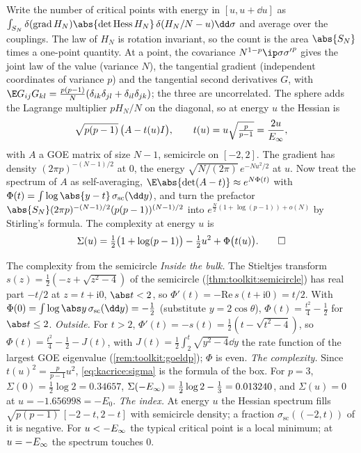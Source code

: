\begin{refsection}
\begin{heuristic}
Write the number of critical points with energy in $[u,u+\dd u]$ as $\int_{S_N}\delta(\kacricegrad H_N)\abs{\det\kacriceHess H_N}\,\delta(H_N/N-u)\dd\sigma$ and average over the couplings. The law of $H_N$ is rotation invariant, so the count is the area $\abs{S_N}$ times a one-point quantity. At a point, the covariance $N^{1-p}\ip\sigma{\sigma'}^p$ gives the joint law of the value (variance $N$), the tangential gradient (independent coordinates of variance $p$) and the tangential second derivatives $G$, with $\E G_{ij}G_{kl}=\frac{p(p-1)}N(\delta_{ik}\delta_{jl}+\delta_{il}\delta_{jk})$; the three are uncorrelated. The sphere adds the Lagrange multiplier $pH_N/N$ on the diagonal, so at energy $u$ the Hessian is
\[
\sqrt{p(p-1)}\,\bigl(A-t(u)I\bigr),\qquad t(u)=u\sqrt{\tfrac p{p-1}}=\frac{2u}{E_\infty},
\]
with $A$ a GOE matrix of size $N-1$, semicircle on $[-2,2]$. The gradient has density $(2\pi p)^{-(N-1)/2}$ at $0$, the energy $\sqrt{N/(2\pi)}\,e^{-Nu^2/2}$ at $u$. Now treat the spectrum of $A$ as self-averaging, $\E\abs{\det(A-t)}\approx e^{N\Phi(t)}$ with $\Phi(t)=\int\log\abs{y-t}\,\sigma_{\mathrm{sc}}(\dd y)$, and turn the prefactor $\abs{S_N}(2\pi p)^{-(N-1)/2}(p(p-1))^{(N-1)/2}$ into $e^{\frac N2(1+\log(p-1))+o(N)}$ by Stirling's formula. The complexity at energy $u$ is
\begin{equation}\label{eq:kacrice:sigma}
\Sigma(u)=\tfrac12\bigl(1+\log(p-1)\bigr)-\tfrac12u^2+\Phi\bigl(t(u)\bigr).\qedhere
\end{equation}
\end{heuristic}

\begin{computation}{The complexity from the semicircle}\label{comp:kacrice:potential}
\step \emph{Inside the bulk.} The Stieltjes transform $s(z)=\frac12(-z+\sqrt{z^2-4})$ of the semicircle (\cref{thm:toolkit:semicircle}) has real part $-t/2$ at $z=t+\mathrm i0$, $\abs t<2$, so $\Phi'(t)=-\mathrm{Re}\,s(t+\mathrm i0)=t/2$. With $\Phi(0)=\int\log\abs y\,\sigma_{\mathrm{sc}}(\dd y)=-\frac12$ (substitute $y=2\cos\theta$), $\Phi(t)=\frac{t^2}4-\frac12$ for $\abs t\le2$.
\step \emph{Outside.} For $t>2$, $\Phi'(t)=-s(t)=\frac12(t-\sqrt{t^2-4})$, so $\Phi(t)=\frac{t^2}4-\frac12-J(t)$, with $J(t)=\frac12\int_2^t\sqrt{y^2-4}\dd y$ the rate function of the largest GOE eigenvalue (\cref{rem:toolkit:goeldp}); $\Phi$ is even.
\step \emph{The complexity.} Since $t(u)^2=\frac p{p-1}u^2$, \eqref{eq:kacrice:sigma} is the formula of the box. For $p=3$, $\Sigma(0)=\frac12\log2=0.34657$, $\Sigma(-E_\infty)=\frac12\log2-\frac13=0.013240$, and $\Sigma(u)=0$ at $u=-1.656998=-E_0$.
\step \emph{The index.} At energy $u$ the Hessian spectrum fills $\sqrt{p(p-1)}\,[-2-t,2-t]$ with semicircle density; a fraction $\sigma_{\mathrm{sc}}((-2,t))$ of it is negative. For $u<-E_\infty$ the typical critical point is a local minimum; at $u=-E_\infty$ the spectrum touches $0$.
\end{computation}


\end{refsection}
